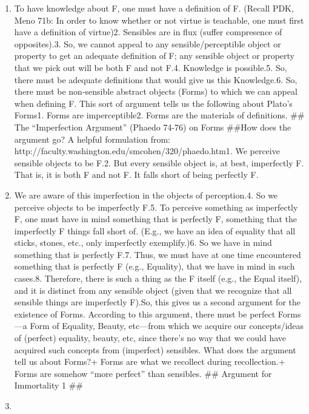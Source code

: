 \documentclass[]{article}
\begin{document}
\begin{enumerate}
\def\labelenumi{\arabic{enumi}.}
\item
  To have knowledge about F, one must have a definition of F. (Recall
  PDK, Meno 71b: In order to know whether or not virtue is teachable,
  one must first have a definition of virtue)2. Sensibles are in flux
  (suffer compresence of opposites).3. So, we cannot appeal to any
  sensible/perceptible object or property to get an adequate definition
  of F; any sensible object or property that we pick out will be both F
  and not F.4. Knowledge is possible.5. So, there must be adequate
  definitions that would give us this Knowledge.6. So, there must be
  non-sensible abstract objects (Forms) to which we can appeal when
  defining F. This sort of argument tells us the following about Plato's
  Forms1. Forms are imperceptible2. Forms are the materials of
  definitions. \#\# The ``Imperfection Argument'' (Phaedo 74-76) on
  Forms \#\#How does the argument go? A helpful formulation from:
  http://faculty.washington.edu/smcohen/320/phaedo.htm1. We perceive
  sensible objects to be F.2. But every sensible object is, at best,
  imperfectly F. That is, it is both F and not F. It falls short of
  being perfectly F.
\item
  We are aware of this imperfection in the objects of perception.4. So
  we perceive objects to be imperfectly F.5. To perceive something as
  imperfectly F, one must have in mind something that is perfectly F,
  something that the imperfectly F things fall short of. (E.g., we have
  an idea of equality that all sticks, stones, etc., only imperfectly
  exemplify.)6. So we have in mind something that is perfectly F.7.
  Thus, we must have at one time encountered something that is perfectly
  F (e.g., Equality), that we have in mind in such cases.8. Therefore,
  there is such a thing as the F itself (e.g., the Equal itself), and it
  is distinct from any sensible object (given that we recognize that all
  sensible things are imperfectly F).So, this gives us a second argument
  for the existence of Forms. According to this argument, there must be
  perfect Forms---a Form of Equality, Beauty, etc---from which we
  acquire our concepts/ideas of (perfect) equality, beauty, etc, since
  there's no way that we could have acquired such concepts from
  (imperfect) sensibles. What does the argument tell us about Forms?+
  Forms are what we recollect during recollection.+ Forms are somehow
  ``more perfect'' than sensibles. \#\# Argument for Immortality 1 \#\#
\item

\end{enumerate}
\end{document}
